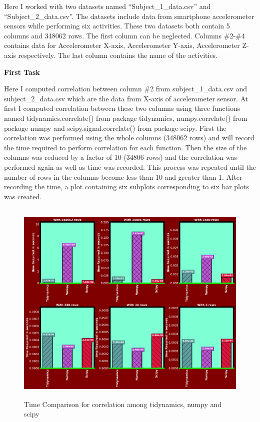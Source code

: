 \documentclass{article}
\begin{document}
Here I worked with two datasets named “Subject\_1\_data.csv” and “Subject\_2\_data.csv”. The datasets include data from smartphone accelerometer sensors while performing six activities. These two datasets both contain 5 columns and 348062 rows. The first column can be neglected. Columns \#2-\#4 contains data for Accelerometer X-axis, Accelerometer Y-axis, Accelerometer Z-axis respectively. The last column contains the name of the activities.


\vspace{1cm}
\textbf{First Task}

Here I computed correlation between column \#2 from subject\_1\_data.csv and subject\_2\_data.csv which are the data from X-axis of accelerometer sensor. At first I computed correlation between these two columns using three functions named tidynamics.correlate() from package tidynamics,  numpy.correlate() from package numpy and scipy.signal.correlate() from package scipy.
First the correlation was performed using the whole columns (348062 rows) and will record the time required to perform correlation for each function. Then the size of the columns was reduced by a factor of 10 (34806 rows) and the correlation was performed again as well as time was recorded. This process was repeated until the number of rows in the columns become less than 10 and greater than 1. After recording the time, a plot containing six subplots corresponding to six bar plots was created.   

\begin{figure}
\hspace*{-2cm}
    \includegraphics[width=16cm,height=10cm]{TimeComparison}
    \caption{Time Comparison for correlation among tidynamics, numpy and scipy}
    \label{fig:mesh1}
\end{figure}
\end{document}
